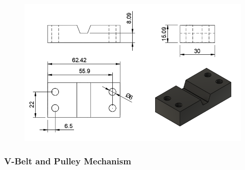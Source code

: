\begin{enumerate}
\begin{figure}[H]
\begin{minipage}{0.45\textwidth}
                \caption{}
                \label{fig:imagen1}
            \end{minipage}%
            \hfill
            \begin{minipage}{0.45\textwidth}
                \centering
                \includegraphics[width=\textwidth]{PLANOS/PLANO_SUJ_BANDA_2.png}
                \caption{}
                \label{fig:imagen2}
            \end{minipage}%
            \hfill
            \end{figure}
    \end{enumerate}

\subsubsection{V-Belt and Pulley Mechanism}

